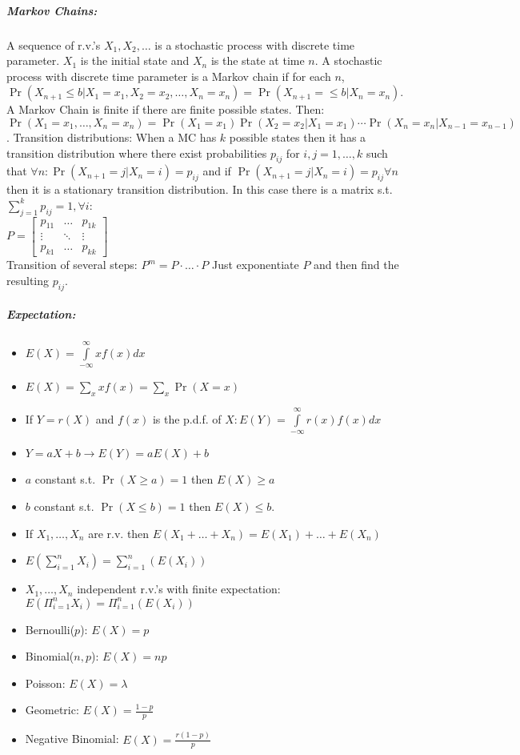 \documentclass[landscape,10pt]{article}
\begin{document}
\begin{multicols}{4}
\subparagraph*{Markov Chains: }
A sequence of r.v.'s \(X_1, X_2, \ldots\) is a stochastic process with discrete time parameter. \(X_1\) is the initial state and \(X_n\) is the state at time \(n\). A stochastic process with discrete time parameter is a Markov chain if for each \(n\), \(\Pr(X_{n+1} \leq b | X_1 = x_1, X_2 = x_2, \ldots, X_n = x_n) = \Pr(X_{n+1} = \leq b | X_n = x_n)\). A Markov Chain is finite if there are finite possible states. Then: \(\Pr(X_1 = x_1, \ldots, X_n = x_n) = \Pr(X_1 = x_1) \Pr(X_2 = x_2 | X_1 = x_1) \cdots \Pr(X_n = x_n | X_{n-1} = x_{n-1}) \). Transition distributions: When a MC has \(k\) possible states then it has a transition distribution where there exist probabilities \(p_{ij}\) for \(i, j = 1, \ldots , k\) such that \(\forall n: \Pr(X_{n+1} = j | X_n = i) = p_{ij}\) and if \(\Pr(X_{n+1} = j | X_n = i) = p_{ij} \forall n\) then it is a stationary transition distribution. In this case there is a matrix s.t. \(\sum\limits_{j=1}^{k}{p_{ij}}=1,  \forall i\): \\
\(P = \begin{bmatrix} 
        p_{11} & \hdots & p_{1k} \\
        \vdots & \ddots & \vdots \\
         p_{k1} & \hdots & p_{kk}
     \end{bmatrix}\)\\     
Transition of several steps: \(P^m = P \cdot \ldots \cdot P\) Just exponentiate \(P\) and then find the resulting \(p_{ij}\).

\subparagraph*{Expectation: }
\begin{itemize}
    \item[] \( E(X) = \int\limits_{-\infty}^{\infty}{x f(x)dx}\)
    \item[] \( E(X) = \sum\limits_{x}xf(x) = \sum\limits_{x}\Pr(X=x)\)
    \item[] If \(Y = r(X)\) and \(f(x)\) is the p.d.f. of \(X: E(Y) = \int\limits_{-\infty}^{\infty}{r(x)f(x)dx}\)
    \item[] \(Y = aX + b \rightarrow E(Y) = aE(X)+b\)
    \item[] \(a\) constant s.t. \(\Pr(X \geq a) = 1\) then \(E(X) \geq a\)
    \item[] \(b\) constant s.t. \(\Pr(X \leq b) = 1\) then \(E(X) \leq b\).
    \item[] If \(X_1, \ldots, X_n \) are r.v. then \(E(X_1+\ldots+X_n) = E(X_1) + \ldots +E(X_n)\)
    \item[] \(E\left( \sum_{i = 1}^{n}X_i \right) = \sum_{i = 1}^{n}(E(X_i))\)
    \item[] \(X_1, \ldots, X_n\) independent r.v.'s with finite expectation: \(E\left(\Pi_{i=1}^{n}{X_i} \right) = \Pi_{i=1}^{n}\left(E(X_i)\right)\)
    \item[] Bernoulli(\(p\)): \(E(X) = p\)
    \item[] Binomial(\(n,p\)): \(E(X) = np\)
    \item[] Poisson: \(E(X) = \lambda\)
    \item[] Geometric: \(E(X) = \frac{1-p}{p}\)
    \item[] Negative Binomial: \(E(X) = \frac{r(1-p)}{p}\)
\end{itemize}


\end{multicols}
\end{document}
